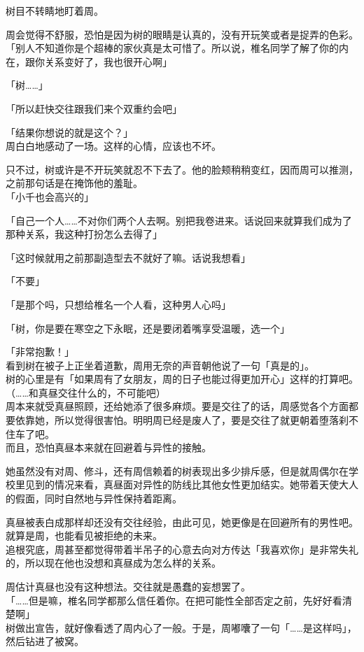 树目不转睛地盯着周。

周会觉得不舒服，恐怕是因为树的眼睛是认真的，没有开玩笑或者是捉弄的色彩。\\

「别人不知道你是个超棒的家伙真是太可惜了。所以说，椎名同学了解了你的内在，跟你关系变好了，我也很开心啊」

「树……」

「所以赶快交往跟我们来个双重约会吧」

「结果你想说的就是这个？」\\

周白白地感动了一场。这样的心情，应该也不坏。

只不过，树或许是不开玩笑就忍不下去了。他的脸颊稍稍变红，因而周可以推测，之前那句话是在掩饰他的羞耻。\\

「小千也会高兴的」

「自己一个人……不对你们两个人去啊。别把我卷进来。话说回来就算我们成为了那种关系，我这种打扮怎么去得了」

「这时候就用之前那副造型去不就好了嘛。话说我想看」

「不要」

「是那个吗，只想给椎名一个人看，这种男人心吗」

「树，你是要在寒空之下永眠，还是要闭着嘴享受温暖，选一个」

「非常抱歉！」\\

看到树在被子上正坐着道歉，周用无奈的声音朝他说了一句「真是的」。\\

树的心里是有「如果周有了女朋友，周的日子也能过得更加开心」这样的打算吧。\\

（……和真昼交往什么的，不可能吧）\\

周本来就受真昼照顾，还给她添了很多麻烦。要是交往了的话，周感觉各个方面都要依靠她，所以觉得很害怕。明明周已经是废人了，要是交往了就更朝着堕落刹不住车了吧。\\

而且，恐怕真昼本来就在回避着与异性的接触。

她虽然没有对周、修斗，还有周信赖着的树表现出多少排斥感，但是就周偶尔在学校里见到的情况来看，真昼面对异性的防线比其他女性更加结实。她带着天使大人的假面，同时自然地与异性保持着距离。

真昼被表白成那样却还没有交往经验，由此可见，她更像是在回避所有的男性吧。\\

就算是周，也能看见被拒绝的未来。\\

追根究底，周甚至都觉得带着半吊子的心意去向对方传达「我喜欢你」是非常失礼的，所以现在他也没想和真昼成为怎么样的关系。

周估计真昼也没有这种想法。交往就是愚蠢的妄想罢了。\\

「……但是嘛，椎名同学都那么信任着你。在把可能性全部否定之前，先好好看清楚啊」\\

树做出宣告，就好像看透了周内心了一般。于是，周嘟囔了一句「……是这样吗」，然后钻进了被窝。
